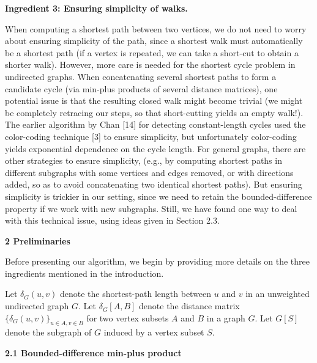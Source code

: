 \par\medskip\noindent\textbf{Ingredient 3: Ensuring simplicity of walks.}\par
When computing a shortest path between two vertices, we do not need to worry about ensuring simplicity of the path, since a shortest walk must automatically be a shortest path (if a vertex is repeated, we can take a short-cut to obtain a shorter walk). However, more care is needed for the shortest cycle problem in undirected graphs. When concatenating several shortest paths to form a candidate cycle (via min-plus products of several distance matrices), one potential issue is that the resulting closed walk might become trivial (we might be completely retracing our steps, so that short-cutting yields an empty walk!). The earlier algorithm by Chan [14] for detecting constant-length cycles used the color-coding technique [3] to ensure simplicity, but unfortunately color-coding yields exponential dependence on the cycle length. For general graphs, there are other strategies to ensure simplicity, (e.g., by computing shortest paths in different subgraphs with some vertices and edges removed, or with directions added, so as to avoid concatenating two identical shortest paths). But ensuring simplicity is trickier in our setting, since we need to retain the bounded-difference property if we work with new subgraphs. Still, we have found one way to deal with this technical issue, using ideas given in Section 2.3.
\par
\par
\par\medskip\noindent\textbf{2 Preliminaries}\par
Before presenting our algorithm, we begin by providing more details on the three ingredients mentioned in the introduction.
\par
\par
Let $\delta_{G}(u,v)$ denote the shortest-path length between $u$ and $v$ in an unweighted undirected graph $G$. Let $\delta_{G}[A,B]$ denote the distance matrix $\{\delta_{G}(u,v)\}_{u\in A,v\in B}$ for two vertex subsets $A$ and $B$ in a graph $G$. Let $G[S]$ denote the subgraph of $G$ induced by a vertex subset $S$.
\par
\par
\par\medskip\noindent\textbf{2.1 Bounded-difference min-plus product}\par
